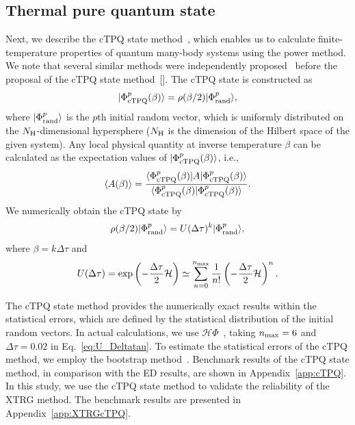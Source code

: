 \documentclass[twocolumn,superscriptaddress,showpacs, longbibliography, aps, prx]{revtex4-2}
\begin{document}
\subsection{Thermal pure quantum state}\label{subsec:Thermal pure quantum state}
Next, we describe the cTPQ state method~\cite{Sugiura_PRL2013}, which enables us to calculate finite-temperature properties of quantum many-body systems using the power method. We note that several similar methods were independently proposed~\cite{Imada_JPSJ1986,Jaklic_PRB1994,Hams_PRE2000,Lloyd} before the proposal of the cTPQ state method~[].
The cTPQ state is constructed as
\begin{align}
  |\Phi_{\rm cTPQ}^{p}(\beta)\rangle = \rho(\beta/2) |\Phi_{\rm rand}^{p}\rangle,
\end{align}
where $|\Phi_{\rm rand}^{p}\rangle$ is the $p$th initial random vector, which is uniformly distributed on the $N_{\rm H}$-dimensional hypersphere ($N_{\rm H}$ is the dimension of the Hilbert space of the given system).
Any local physical quantity at inverse temperature $\beta$ can be calculated as the expectation values of $|\Phi_{\rm cTPQ}^{p}(\beta)\rangle$, i.e.,
\begin{align}
\langle A(\beta)\rangle
=\frac{\langle \Phi_{\rm cTPQ}^{p}(\beta)|A|\Phi_{\rm cTPQ}^{p}(\beta)\rangle}
{\langle \Phi_{\rm cTPQ}^{p}(\beta)|\Phi_{\rm cTPQ}^{p}(\beta)\rangle}.
\end{align}
We numerically obtain the cTPQ state by 
\begin{align}
\rho(\beta/2) |\Phi_{\rm rand}^{p}\rangle=U(\Delta\tau)^{k}|\Phi_{\rm rand}^{p}\rangle,
\end{align}
where $\beta=k\Delta\tau$ and 
\begin{align}
U(\Delta\tau)=\exp
\left(-\frac{\Delta\tau}{2}\mathcal{H}\right)
\simeq\sum_{n=0}^{n_{\rm max}}\frac{1}{n!}\left(-\frac{\Delta\tau}{2}\mathcal{H}\right)^{n}. 
\label{eq:U_Deltatau}
\end{align}

The cTPQ state method provides the numerically exact
results within the statistical errors, which are defined by the statistical distribution of the initial random vectors.
In actual calculations, we use $\mathcal{H}\Phi$~\cite{Kawamura_CPC2017,HPhi_v2,HPhi_release}, taking $n_{\rm max}=6$ and $\Delta\tau =0.02$ in Eq.~\eqref{eq:U_Deltatau}.
To estimate the statistical errors of the cTPQ method, we employ the bootstrap method~\cite{HPhi_v2}.
Benchmark results of the cTPQ state method, in comparison with the ED results, are shown in Appendix~\ref{app:cTPQ}. 
In this study, we use the cTPQ state method to validate the reliability of the XTRG method. 
The benchmark results are presented in Appendix~\ref{app:XTRGcTPQ}.
\end{document}
